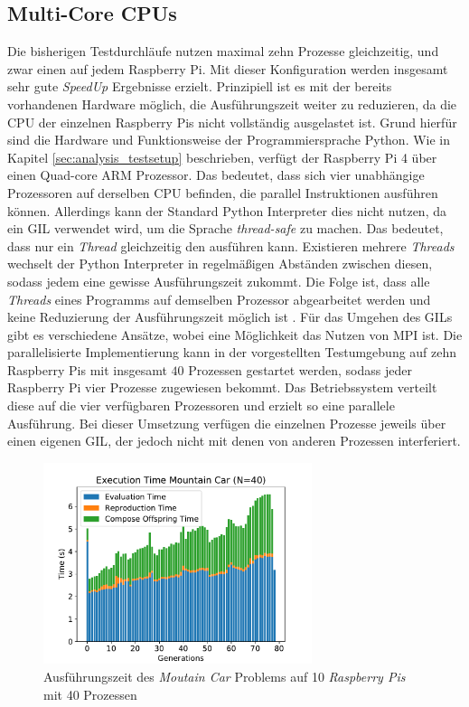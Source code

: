 \subsection{Multi-Core CPUs}
Die bisherigen Testdurchläufe nutzen maximal zehn Prozesse gleichzeitig, und zwar einen auf jedem Raspberry Pi. Mit dieser Konfiguration werden insgesamt sehr gute \emph{SpeedUp} Ergebnisse erzielt. Prinzipiell ist es mit der bereits vorhandenen Hardware möglich, die Ausführungszeit weiter zu reduzieren, da die \ac{CPU} der einzelnen Raspberry Pis nicht vollständig ausgelastet ist. Grund hierfür sind die Hardware und Funktionsweise der Programmiersprache Python. Wie in Kapitel \ref{sec:analysis_testsetup} beschrieben, verfügt der Raspberry Pi 4 über einen Quad-core ARM Prozessor. Das bedeutet, dass sich vier unabhängige Prozessoren auf derselben \ac{CPU} befinden, die parallel Instruktionen ausführen können. Allerdings kann der Standard Python Interpreter dies nicht nutzen, da ein \ac{GIL} verwendet wird, um die Sprache \emph{thread-safe} zu machen. Das bedeutet, dass nur ein \emph{Thread} gleichzeitig den ausführen kann. Existieren mehrere \emph{Threads} wechselt der Python Interpreter in regelmäßigen Abständen zwischen diesen, sodass jedem eine gewisse Ausführungszeit zukommt. Die Folge ist, dass alle \emph{Threads} eines Programms auf demselben Prozessor abgearbeitet werden und keine Reduzierung der Ausführungszeit möglich ist \cite{marowka2018python}. Für das Umgehen des \acp{GIL} gibt es verschiedene Ansätze, wobei eine Möglichkeit das Nutzen von \ac{MPI} ist. Die parallelisierte Implementierung kann in der vorgestellten Testumgebung auf zehn Raspberry Pis mit insgesamt $40$ Prozessen gestartet werden, sodass jeder Raspberry Pi vier Prozesse zugewiesen bekommt. Das Betriebssystem verteilt diese auf die vier verfügbaren Prozessoren und erzielt so eine parallele Ausführung. Bei dieser Umsetzung verfügen die einzelnen Prozesse jeweils über einen eigenen \ac{GIL}, der jedoch nicht mit denen von anderen Prozessen interferiert.
\begin{figure}[!h]
	\centering
	\includegraphics[width=0.7\textwidth]{./img/mountain_car_analysis/1413_time_40core_10pi.pdf} 
	\caption{Ausführungszeit des \emph{Moutain Car} Problems auf 10 \emph{Raspberry Pis} mit 40 Prozessen}
	\label{fig:mountain_car_time_40core_10pi}
\end{figure}
